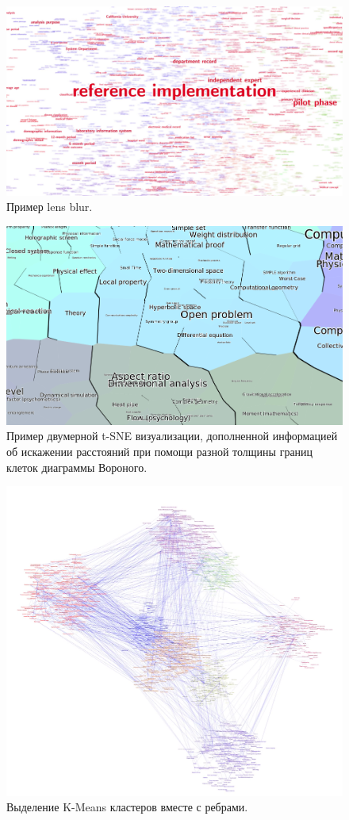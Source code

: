 \begin{figure}[h]
  \centering
  \includegraphics[width=\textwidth]{shots/lens.png}
  \caption{Пример lens blur.}
\end{figure}

\begin{figure}[h]
  \centering
  \includegraphics[width=\textwidth]{shots/voronoi_1.png}
  \caption{Пример двумерной t-SNE визуализации, дополненной информацией об искажении расстояний при помощи разной толщины границ клеток диаграммы Вороного.}
\end{figure}

\begin{figure}[h]
  \centering
  \includegraphics[width=\textwidth]{shots/clusters.png}
  \caption{Выделение K-Means кластеров вместе с ребрами.}
\end{figure}


  

